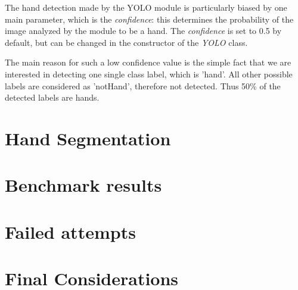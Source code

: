 The hand detection made by the YOLO module is particularly biased by one main parameter, which is the \textit{confidence}: this determines the 
probability of the image analyzed by the module to be a hand. The \textit{confidence} is set to 0.5 by default, but can be changed in the constructor of the \textit{YOLO} class.

The main reason for such a low confidence value is the simple fact that we are interested in detecting one single class label, which is 'hand'. All other possible labels are considered as 
'notHand', therefore not detected. Thus 50\% of the detected labels are hands.

\section{Hand Segmentation}

\section{Benchmark results}

\section{Failed attempts}

\section{Final Considerations}


